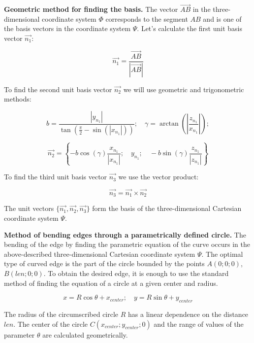 \textbf{Geometric method for finding the basis.} The vector $\overrightarrow{AB}$ in the three-dimensional coordinate system $\Phi$ corresponds to the segment $AB$ and is one of the basis vectors in the coordinate system $\Psi$. Let's calculate the first unit basis vector $\overrightarrow{n_1}$:

$$
\overrightarrow{n_1} = \frac
{\overrightarrow{AB}}
{\left|\overrightarrow{AB}\right|}
$$


To find the second unit basis vector $\overrightarrow{n_2}$ we will use geometric and trigonometric methods:

$$
b = \frac
{\left|y_{n_1}\right|}
{\tan\left(
\frac{\pi}{2}
-\sin(\left|x_{n_1}\right|)
\right)};
\quad
\gamma = \arctan\left(
\left|
\frac{z_{n_1}}{x_{n_1}}
\right|
\right);
$$

$$
\overrightarrow{n_2} = \left\{
-b\cos(\gamma)
\frac{x_{n_1}}
{\left|x_{n_1}\right|};
\quad
y_{n_1};
\quad
-b\sin(\gamma)
\frac{z_{n_1}}
{\left|z_{n_1}\right|}
\right\}
$$

To find the third unit basis vector $\overrightarrow{n_3}$ we use the vector product:

$$
\overrightarrow{n_3} = \overrightarrow{n_1} \times \overrightarrow{n_2}
$$

The unit vectors $\{\overrightarrow{n_1}, \overrightarrow{n_2}, \overrightarrow{n_3}\}$ form the basis of the three-dimensional Cartesian coordinate system $\Psi$.

\textbf{Method of bending edges through a parametrically defined circle.} The bending of the edge by finding the parametric equation of the curve occurs in the above-described three-dimensional Cartesian coordinate system $\Psi$. The optimal type of curved edge is the part of the circle bounded by the points $A(0; 0; 0)$, $B\left(len; 0; 0 \right)$. To obtain the desired edge, it is enough to use the standard method of finding the equation of a circle at a given center and radius.

$$
x = R\cos\theta + x_{center};
\quad
y = R\sin\theta + y_{center}
$$

The radius of the circumscribed circle $R$ has a linear dependence on the distance $len$. The center of the circle $C(x_{center}; y_{center}; 0)$ and the range of values of the parameter $\theta$ are calculated geometrically.
